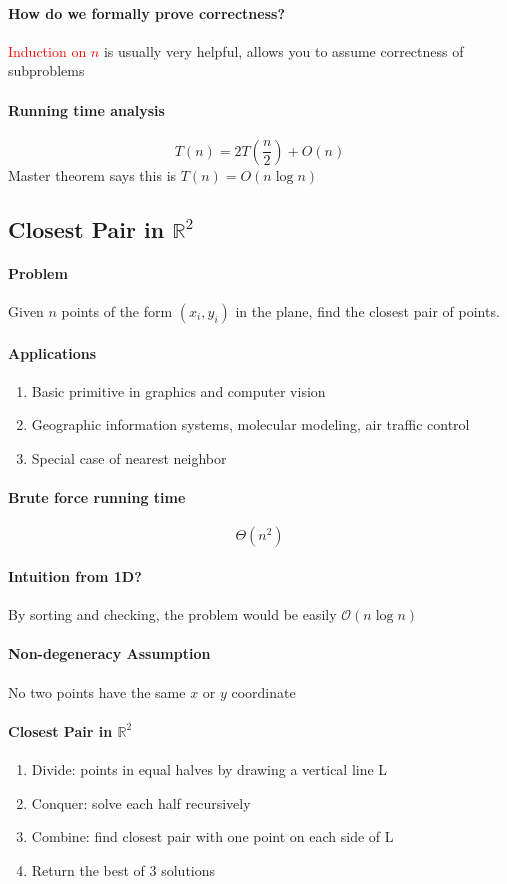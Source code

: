 \documentclass[11pt]{article}
\newcommand{\real}[0]{\mathbb{R}}
\begin{document}
\paragraph{How do we formally prove correctness?}
\textcolor{red}{Induction on $n$} is usually very helpful, allows you to assume correctness of subproblems

\paragraph{Running time analysis}
$$T(n) = 2T(\frac{n}{2}) + O(n)$$
Master theorem says this is $T(n) = O(n \log n)$

\subsection{Closest Pair in $\real^2$}
\paragraph{Problem}
Given $n$ points of the form $(x_i, y_i)$ in the plane, find the closest pair of points.
\paragraph{Applications}
\begin{enumerate}
	\item Basic primitive in graphics and computer vision
	\item Geographic information systems, molecular modeling, air traffic control
	\item Special case of nearest neighbor
\end{enumerate}

\paragraph{Brute force running time}
$$\Theta(n^2)$$
\paragraph{Intuition from 1D?}
By sorting and checking, the problem would be easily $\mathcal{O}(n\log n)$
\paragraph{Non-degeneracy Assumption}
No two points have the same $x$ or $y$ coordinate
\paragraph{Closest Pair in $\real^2$}
\begin{enumerate}
	\item Divide: points in equal halves by drawing a vertical line L
	\item Conquer: solve each half recursively
	\item Combine: find closest pair with one point on each side of L
	\item Return the best of 3 solutions
\end{enumerate}
\end{document}

